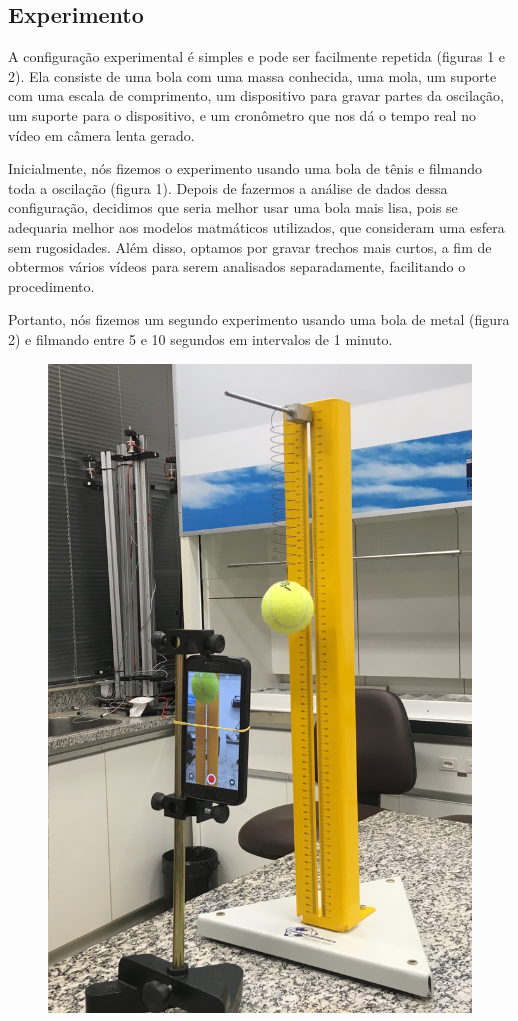 \documentclass[a4paper, 12pt]{article}
\begin{document}
\begin{multicols}{2}
		\section{Experimento}
		\label{sec:experimento}
			\par A configuração experimental é simples e pode ser facilmente repetida (figuras 1 e 2). Ela consiste de uma bola com uma massa conhecida, uma mola, um suporte com uma escala de comprimento, um dispositivo para gravar partes da oscilação, um suporte para o dispositivo, e um cronômetro que nos dá o tempo real no vídeo em câmera lenta gerado.
			\par Inicialmente, nós fizemos o experimento usando uma bola de tênis e filmando toda a oscilação (figura 1). Depois de fazermos a análise de dados dessa configuração, decidimos que seria melhor usar uma bola mais lisa, pois se adequaria melhor aos modelos matmáticos utilizados, que consideram uma esfera sem rugosidades. Além disso, optamos por gravar trechos mais curtos, a fim de obtermos vários vídeos para serem analisados separadamente, facilitando o procedimento.
			\par Portanto, nós fizemos um segundo experimento usando uma bola de metal (figura 2) e filmando entre 5 e 10 segundos em intervalos de 1 minuto.
			\begin{figure}[H]
				\centering
				\includegraphics[scale=0.09]{./img/bolaTenis.jpg}

\end{figure}
\end{multicols}
\end{document}
